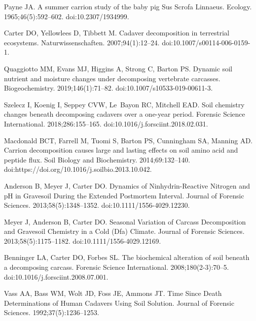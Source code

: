 \documentclass[
  10pt,
  letterpaper,
]{article}
\begin{document}
\begin{thebibliography}{10}
  Payne JA.
  \newblock A summer carrion study of the baby pig {Sus} {Scrofa} {Linnaeus}.
  \newblock Ecology. 1965;46(5):592--602.
  \newblock doi:{10.2307/1934999}.
  
  Carter DO, Yellowlees D, Tibbett M.
  \newblock Cadaver decomposition in terrestrial ecosystems.
  \newblock Naturwissenschaften. 2007;94(1):12--24.
  \newblock doi:{10.1007/s00114-006-0159-1}.
  
  Quaggiotto MM, Evans MJ, Higgins A, Strong C, Barton PS.
  \newblock Dynamic soil nutrient and moisture changes under decomposing
    vertebrate carcasses.
  \newblock Biogeochemistry. 2019;146(1):71--82.
  \newblock doi:{10.1007/s10533-019-00611-3}.
  
  Szelecz I, Koenig I, Seppey CVW, Le~Bayon RC, Mitchell EAD.
  \newblock Soil chemistry changes beneath decomposing cadavers over a one-year
    period.
  \newblock Forensic Science International. 2018;286:155--165.
  \newblock doi:{10.1016/j.forsciint.2018.02.031}.
  
  Macdonald BCT, Farrell M, Tuomi S, Barton PS, Cunningham SA, Manning AD.
  \newblock Carrion decomposition causes large and lasting effects on soil amino
    acid and peptide flux.
  \newblock Soil Biology and Biochemistry. 2014;69:132--140.
  \newblock doi:{https://doi.org/10.1016/j.soilbio.2013.10.042}.
  
  Anderson B, Meyer J, Carter DO.
  \newblock Dynamics of {Ninhydrin}-{Reactive} {Nitrogen} and {pH} in {Gravesoil}
    {During} the {Extended} {Postmortem} {Interval}.
  \newblock Journal of Forensic Sciences. 2013;58(5):1348--1352.
  \newblock doi:{10.1111/1556-4029.12230}.
  
  Meyer J, Anderson B, Carter DO.
  \newblock Seasonal {Variation} of {Carcass} {Decomposition} and {Gravesoil}
    {Chemistry} in a {Cold} ({Dfa}) {Climate}.
  \newblock Journal of Forensic Sciences. 2013;58(5):1175--1182.
  \newblock doi:{10.1111/1556-4029.12169}.
  
  Benninger LA, Carter DO, Forbes SL.
  \newblock The biochemical alteration of soil beneath a decomposing carcass.
  \newblock Forensic Science International. 2008;180(2-3):70--5.
  \newblock doi:{10.1016/j.forsciint.2008.07.001}.
  
  Vass AA, Bass WM, Wolt JD, Foss JE, Ammons JT.
  \newblock Time Since Death Determinations of Human Cadavers Using Soil
    Solution.
  \newblock Journal of Forensic Sciences. 1992;37(5):1236--1253.
  

\end{thebibliography}
\end{document}
